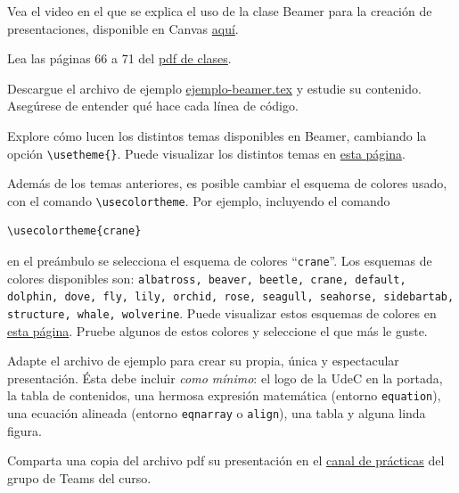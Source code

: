 \documentclass[11pt]{exam}
\begin{document}
\begin{questions}
\item Vea el video en el que se explica el uso de la clase Beamer para la creación de presentaciones, disponible en Canvas \href{https://udec.instructure.com/courses/40179/pages/presentaciones-en-beamer}{aquí}.
\item Lea las páginas 66 a 71 del \href{https://udec.instructure.com/courses/40179/pages/latex-pdf-presentacion?module_item_id=1465499}{pdf de clases}.
\item Descargue el archivo de ejemplo \href{https://raw.githubusercontent.com/gfrubi/CC/master/LaTeX/ejemplo-beamer.tex}{ejemplo-beamer.tex} y estudie su contenido. Asegúrese de entender qué hace cada línea de código.
\item Explore cómo lucen los distintos temas disponibles en Beamer, cambiando la opción \verb|\usetheme{}|. Puede visualizar los distintos temas en \href{https://deic.uab.cat/~iblanes/beamer_gallery/index_by_theme.html}{esta página}.

\item Además de los temas anteriores, es posible cambiar el esquema de colores usado, con el comando \verb|\usecolortheme|. Por ejemplo, incluyendo el comando 
\begin{verbatim}
\usecolortheme{crane}
\end{verbatim}
en el preámbulo se selecciona el esquema de colores ``\texttt{crane}''. Los esquemas de colores disponibles son: \texttt{albatross, beaver, beetle, crane, default, dolphin, dove, fly, lily, orchid, rose, seagull, seahorse, sidebartab, structure, whale, wolverine}. Puede visualizar estos esquemas de colores en \href{https://deic.uab.cat/~iblanes/beamer_gallery/index_by_color.html}{esta página}. Pruebe algunos de estos colores y seleccione el que más le guste.

\item Adapte el archivo de ejemplo para crear su propia, única y espectacular presentación. Ésta debe incluir \textit{como mínimo}: el logo de la UdeC en la portada, la tabla de contenidos, una hermosa expresión matemática (entorno \texttt{equation}), una ecuación alineada (entorno \texttt{eqnarray} o \texttt{align}), una tabla y alguna linda figura.
\item Comparta una copia del archivo pdf su presentación en el \href{https://teams.microsoft.com/l/channel/19\%3A687f654a686c467bb9f41e0970b179a6\%40thread.tacv2/pr\%C3\%A1cticas?groupId=adc7e83d-1b47-4662-9902-fedf7923a4fb&tenantId=56582b9e-8824-49d0-a665-cd328c0e004a}{canal de prácticas} del grupo de Teams del curso.
\end{questions}
\end{document}
